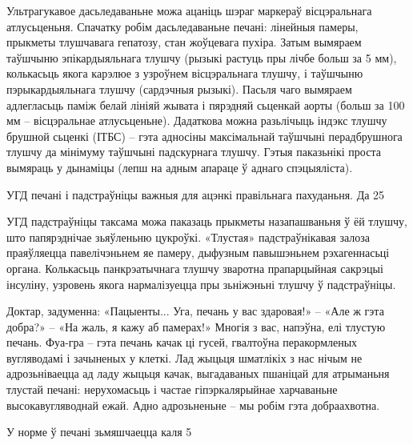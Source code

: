 Ультрагукавое дасьледаваньне можа ацаніць шэраг маркераў вісцэральнага атлусьценьня. Спачатку робім дасьледаваньне печані: лінейныя памеры, прыкметы тлушчавага гепатозу, стан жоўцевага пухіра. Затым вымяраем таўшчыню эпікардыяльнага тлушчу (рызыкі растуць пры лічбе больш за 5 мм), колькасьць якога карэлюе з узроўнем вісцэральнага тлушчу, і таўшчыню пэрыкардыяльнага тлушчу (сардэчныя рызыкі). Пасьля чаго вымяраем адлегласьць паміж белай лініяй жывата і пярэдняй сьценкай аорты (больш за 100 мм – вісцэральнае атлусьценьне). Дадаткова можна разьлічыць індэкс тлушчу брушной сьценкі (ІТБС) – гэта адносіны максімальнай таўшчыні перадбрушнога тлушчу да мінімуму таўшчыні падскурнага тлушчу. Гэтыя паказьнікі проста вымяраць у дынаміцы (лепш на адным апараце ў аднаго спэцыяліста).

УГД печані і падстраўніцы важныя для ацэнкі правільнага пахуданьня. Да 25%

УГД падстраўніцы таксама можа паказаць прыкметы назапашваньня ў ёй тлушчу, што папярэднічае зьяўленьню цукроўкі. «Тлустая» падстраўнікавая залоза праяўляецца павелічэньнем яе памеру, дыфузным павышэньнем рэхагеннасьці органа. Колькасьць панкрэатычнага тлушчу зваротна прапарцыйная сакрэцыі інсуліну, узровень якога нармалізуецца пры зьніжэньні тлушчу ў падстраўніцы.

Доктар, задуменна: «Пацыенты... Уга, печань у вас здаровая!» – «Але ж гэта добра?» – «На жаль, я кажу аб памерах!» Многія з вас, напэўна, елі тлустую печань. Фуа-гра – гэта печань качак ці гусей, гвалтоўна перакормленых вугляводамі і зачыненых у клеткі. Лад жыцьця шматлікіх з нас нічым не адрозьніваецца ад ладу жыцьця качак, выгадаваных пшаніцай для атрыманьня тлустай печані: нерухомасьць і частае гіпэркалярыйнае харчаваньне высокавугляводнай ежай. Адно адрозьненьне – мы робім гэта добраахвотна.

У норме ў печані зьмяшчаецца каля 5%

